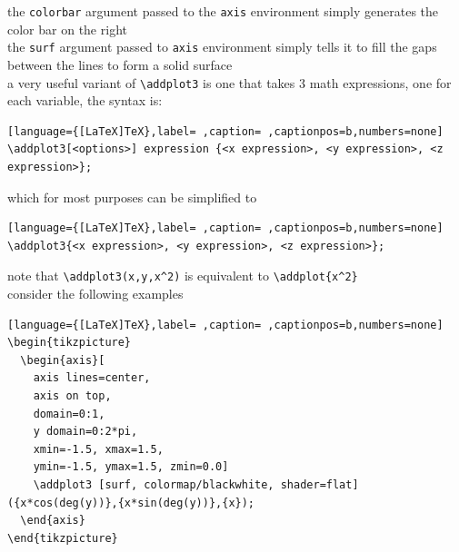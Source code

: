 \documentclass[a4paper,12pt]{article}
\begin{document}
the \texttt{colorbar} argument passed to the \texttt{axis} environment simply generates the color bar on the right\\[0pt]

the \texttt{surf} argument passed to \texttt{axis} environment simply tells it to fill the gaps between the lines to form a solid surface\\[0pt]

a very useful variant of \texttt{\textbackslash{}addplot3} is one that takes 3 math expressions, one for each variable, the syntax is:\\[0pt]

\begin{lstlisting}[language={[LaTeX]TeX},label= ,caption= ,captionpos=b,numbers=none]
\addplot3[<options>] expression {<x expression>, <y expression>, <z expression>};
\end{lstlisting}

which for most purposes can be simplified to\\[0pt]

\begin{lstlisting}[language={[LaTeX]TeX},label= ,caption= ,captionpos=b,numbers=none]
\addplot3{<x expression>, <y expression>, <z expression>};
\end{lstlisting}

note that \texttt{\textbackslash{}addplot3(x,y,x\textasciicircum{}2)} is equivalent to \texttt{\textbackslash{}addplot\{x\textasciicircum{}2\}}\\[0pt]

consider the following examples\\[0pt]

\begin{lstlisting}[language={[LaTeX]TeX},label= ,caption= ,captionpos=b,numbers=none]
\begin{tikzpicture}
  \begin{axis}[
    axis lines=center,
    axis on top,
    domain=0:1,
    y domain=0:2*pi,
    xmin=-1.5, xmax=1.5,
    ymin=-1.5, ymax=1.5, zmin=0.0]
    \addplot3 [surf, colormap/blackwhite, shader=flat] ({x*cos(deg(y))},{x*sin(deg(y))},{x});
  \end{axis}
\end{tikzpicture}
\end{lstlisting}

\\[0pt]
\end{document}
